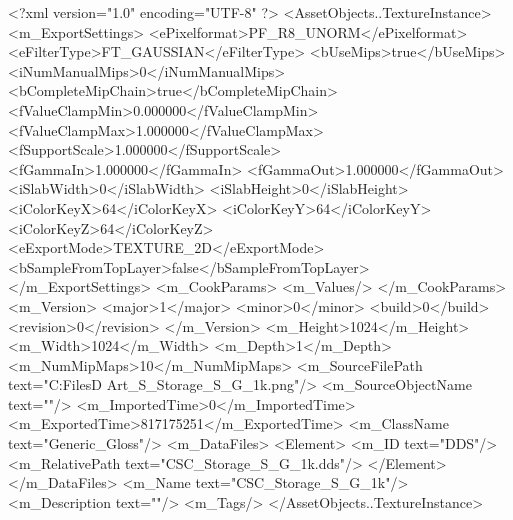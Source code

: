 <?xml version="1.0" encoding="UTF-8" ?>
<AssetObjects..TextureInstance>
	<m_ExportSettings>
		<ePixelformat>PF_R8_UNORM</ePixelformat>
		<eFilterType>FT_GAUSSIAN</eFilterType>
		<bUseMips>true</bUseMips>
		<iNumManualMips>0</iNumManualMips>
		<bCompleteMipChain>true</bCompleteMipChain>
		<fValueClampMin>0.000000</fValueClampMin>
		<fValueClampMax>1.000000</fValueClampMax>
		<fSupportScale>1.000000</fSupportScale>
		<fGammaIn>1.000000</fGammaIn>
		<fGammaOut>1.000000</fGammaOut>
		<iSlabWidth>0</iSlabWidth>
		<iSlabHeight>0</iSlabHeight>
		<iColorKeyX>64</iColorKeyX>
		<iColorKeyY>64</iColorKeyY>
		<iColorKeyZ>64</iColorKeyZ>
		<eExportMode>TEXTURE_2D</eExportMode>
		<bSampleFromTopLayer>false</bSampleFromTopLayer>
	</m_ExportSettings>
	<m_CookParams>
		<m_Values/>
	</m_CookParams>
	<m_Version>
		<major>1</major>
		<minor>0</minor>
		<build>0</build>
		<revision>0</revision>
	</m_Version>
	<m_Height>1024</m_Height>
	<m_Width>1024</m_Width>
	<m_Depth>1</m_Depth>
	<m_NumMipMaps>10</m_NumMipMaps>
	<m_SourceFilePath text="C:\Users\Shadow\Desktop\Working Files\3D Art\Storage_S\CSC_Storage_S_G_1k.png"/>
	<m_SourceObjectName text=""/>
	<m_ImportedTime>0</m_ImportedTime>
	<m_ExportedTime>817175251</m_ExportedTime>
	<m_ClassName text="Generic_Gloss"/>
	<m_DataFiles>
		<Element>
			<m_ID text="DDS"/>
			<m_RelativePath text="CSC_Storage_S_G_1k.dds"/>
		</Element>
	</m_DataFiles>
	<m_Name text="CSC_Storage_S_G_1k"/>
	<m_Description text=""/>
	<m_Tags/>
</AssetObjects..TextureInstance>

